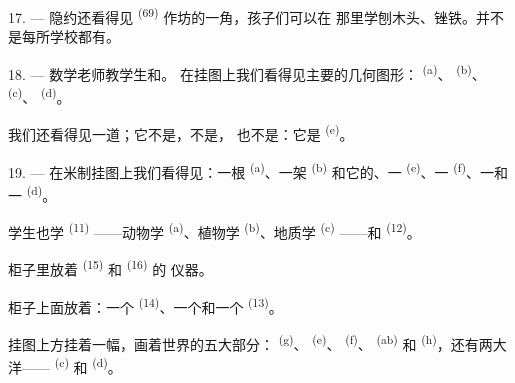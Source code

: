 17. --- 隐约还看得见 \textsuperscript{(69)} 作坊的一角，孩子们可以在
那里学刨木头、锉铁。并不是每所学校都有。

\VUsaut{5.0mm}
\VUsaut{3.6mm}

18. --- 数学老师教学生和。
在挂图上我们看得见主要的几何图形： \textsuperscript{(a)}、
 \textsuperscript{(b)}、 \textsuperscript{(c)}、
 \textsuperscript{(d)}。

我们还看得见一道；它不是，不是，
也不是：它是 \textsuperscript{(e)}。

19. --- 在米制挂图上我们看得见：一根 \textsuperscript{(a)}、一架
 \textsuperscript{(b)} 和它的、一
\textsuperscript{(e)}、一 \textsuperscript{(f)}、一和一
 \textsuperscript{(d)}。

学生也学 \textsuperscript{(11)} ——动物学 \textsuperscript{(a)}、植物学
\textsuperscript{(b)}、地质学 \textsuperscript{(c)} ——和 \textsuperscript{(12)}。

柜子里放着 \textsuperscript{(15)} 和 \textsuperscript{(16)} 的
仪器。

柜子上面放着：一个 \textsuperscript{(14)}、一个和一个
 \textsuperscript{(13)}。

挂图上方挂着一幅，画着世界的五大部分：
\textsuperscript{(g)}、 \textsuperscript{(e)}、 \textsuperscript{(f)}、
 \textsuperscript{(ab)} 和 \textsuperscript{(h)}，还有两大
洋—— \textsuperscript{(c)} 和 \textsuperscript{(d)}。
\VUsaut{6.0mm}
\VUfilet{22mm}
